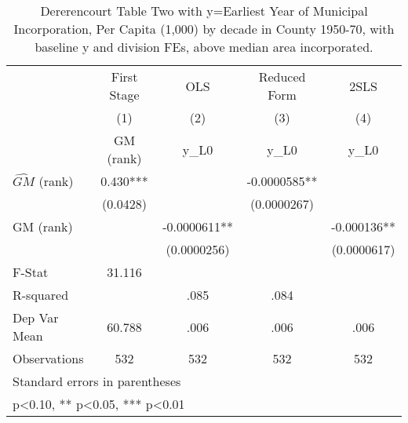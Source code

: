 \begin{table}[htbp]\centering
\def\sym#1{\ifmmode^{#1}\else\(^{#1}\)\fi}
\caption{Dererencourt Table Two with y=Earliest Year of Municipal Incorporation, Per Capita (1,000) by decade in County 1950-70, with baseline y and division FEs, above median area incorporated.}
\begin{tabular}{l*{4}{c}}
\toprule
                    & First Stage   &         OLS   &Reduced Form   &        2SLS   \\
                    &\multicolumn{1}{c}{(1)}&\multicolumn{1}{c}{(2)}&\multicolumn{1}{c}{(3)}&\multicolumn{1}{c}{(4)}\\
                    &\multicolumn{1}{c}{GM  (rank)}&\multicolumn{1}{c}{y\_L0}&\multicolumn{1}{c}{y\_L0}&\multicolumn{1}{c}{y\_L0}\\
\midrule
$\hat{GM}$ (rank)   &       0.430***&               &  -0.0000585** &               \\
                    &    (0.0428)   &               & (0.0000267)   &               \\
\addlinespace
GM  (rank)          &               &  -0.0000611** &               &   -0.000136** \\
                    &               & (0.0000256)   &               & (0.0000617)   \\
\midrule
F-Stat              &      31.116   &               &               &               \\
R-squared           &               &        .085   &        .084   &               \\
Dep Var Mean        &      60.788   &        .006   &        .006   &        .006   \\
Observations        &         532   &         532   &         532   &         532   \\
\bottomrule
\multicolumn{5}{l}{\footnotesize Standard errors in parentheses}\\
\multicolumn{5}{l}{\footnotesize * p<0.10, ** p<0.05, *** p<0.01}\\
\end{tabular}
\end{table}
